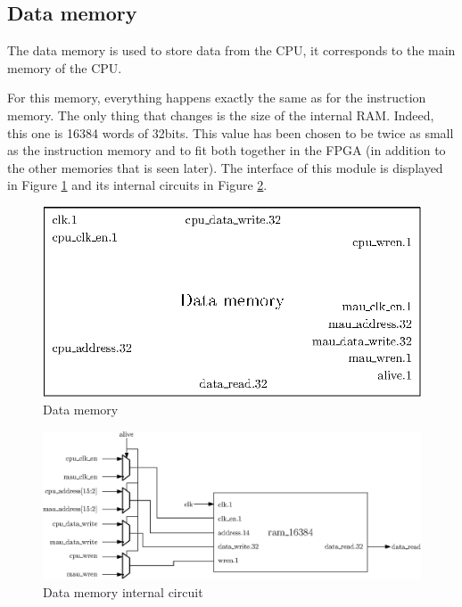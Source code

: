 \subsection{Data memory}

The data memory is used to store data from the CPU, it corresponds to the main memory of the CPU.

For this memory, everything happens exactly the same as for the instruction memory. The only 
thing that changes is the size of the internal RAM. Indeed, this one is 16384 words of 32bits. This 
value has been chosen to be twice as small as the instruction memory and to fit both together in 
the FPGA (in addition to the other memories that is seen later). The interface of this module
is displayed in Figure \ref{fig:components/dm} and its internal circuits in Figure \ref{fig:components/dm_in}.

\begin{figure}[H]
    \centering
    \includegraphics[scale=0.8]{Chapter3-CPU/res/data_memory}
    \caption{Data memory}
    \label{fig:components/dm}
\end{figure}

\begin{figure}[H]
    \centering
    \includegraphics[width=\linewidth]{Chapter3-CPU/res/data_memory_in}
    \caption{Data memory internal circuit}
    \label{fig:components/dm_in}
\end{figure}

